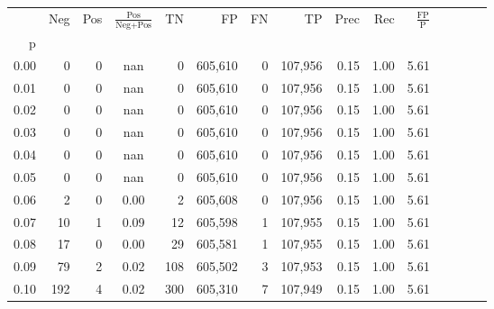 \begin{tabular}{rrrcrrrrrrrrrrr}
\toprule
{} &     Neg &    Pos & $\frac{\text{Pos}}{\text{Neg}+\text{Pos}}$ &       TN &       FP &       FN &       TP &  Prec &   Rec & $\frac{\text{FP}}{\text{P}}$ \\
p    &         &        &                                            &          &          &          &          &       &       &                              \\
\midrule
0.00 &       0 &      0 &                                        nan &        0 &  605,610 &        0 &  107,956 &  0.15 &  1.00 &                         5.61 \\
0.01 &       0 &      0 &                                        nan &        0 &  605,610 &        0 &  107,956 &  0.15 &  1.00 &                         5.61 \\
0.02 &       0 &      0 &                                        nan &        0 &  605,610 &        0 &  107,956 &  0.15 &  1.00 &                         5.61 \\
0.03 &       0 &      0 &                                        nan &        0 &  605,610 &        0 &  107,956 &  0.15 &  1.00 &                         5.61 \\
0.04 &       0 &      0 &                                        nan &        0 &  605,610 &        0 &  107,956 &  0.15 &  1.00 &                         5.61 \\
0.05 &       0 &      0 &                                        nan &        0 &  605,610 &        0 &  107,956 &  0.15 &  1.00 &                         5.61 \\
0.06 &       2 &      0 &                                       0.00 &        2 &  605,608 &        0 &  107,956 &  0.15 &  1.00 &                         5.61 \\
0.07 &      10 &      1 &                                       0.09 &       12 &  605,598 &        1 &  107,955 &  0.15 &  1.00 &                         5.61 \\
0.08 &      17 &      0 &                                       0.00 &       29 &  605,581 &        1 &  107,955 &  0.15 &  1.00 &                         5.61 \\
0.09 &      79 &      2 &                                       0.02 &      108 &  605,502 &        3 &  107,953 &  0.15 &  1.00 &                         5.61 \\
0.10 &     192 &      4 &                                       0.02 &      300 &  605,310 &        7 &  107,949 &  0.15 &  1.00 &                         5.61 \\

\end{tabular}
